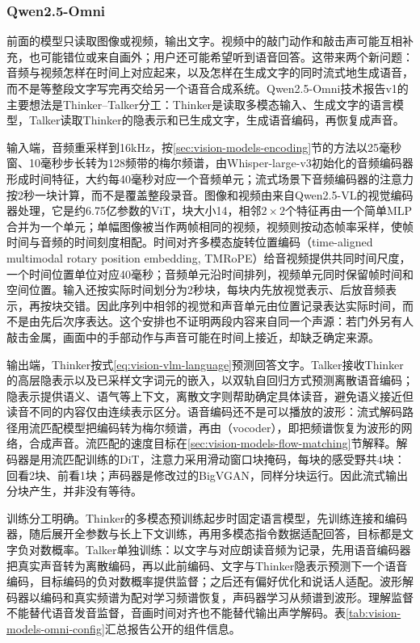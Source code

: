 \subsubsection{Qwen2.5-Omni}
\label{sec:vision-models-qwen-omni}

前面的模型只读取图像或视频，输出文字。视频中的敲门动作和敲击声可能互相补充，也可能错位或来自画外；用户还可能希望听到语音回答。这带来两个新问题：音频与视频怎样在时间上对应起来，以及怎样在生成文字的同时流式地生成语音，而不是等整段文字写完再交给另一个语音合成系统。Qwen2.5-Omni技术报告v1的主要想法是Thinker--Talker分工：Thinker是读取多模态输入、生成文字的语言模型，Talker读取Thinker的隐表示和已生成文字，生成语音编码，再恢复成声音。

输入端，音频重采样到16kHz，按\ref{sec:vision-models-encoding}节的方法以25毫秒窗、10毫秒步长转为128频带的梅尔频谱，由Whisper-large-v3初始化的音频编码器形成时间特征，大约每40毫秒对应一个音频单元；流式场景下音频编码器的注意力按2秒一块计算，而不是覆盖整段录音。图像和视频由来自Qwen2.5-VL的视觉编码器处理，它是约6.75亿参数的ViT，块大小14，相邻$2\times2$个特征再由一个简单MLP合并为一个单元；单幅图像被当作两帧相同的视频，视频则按动态帧率采样，使帧时间与音频的时间刻度相配。时间对齐多模态旋转位置编码（time-aligned multimodal rotary position embedding, TMRoPE）给音视频提供共同时间尺度，一个时间位置单位对应40毫秒；音频单元沿时间排列，视频单元同时保留帧时间和空间位置。输入还按实际时间划分为2秒块，每块内先放视觉表示、后放音频表示，再按块交错。因此序列中相邻的视觉和声音单元由位置记录表达实际时间，而不是由先后次序表达。这个安排也不证明两段内容来自同一个声源：若门外另有人敲击金属，画面中的手部动作与声音可能在时间上接近，却缺乏确定来源。

输出端，Thinker按式\eqref{eq:vision-vlm-language}预测回答文字。Talker接收Thinker的高层隐表示以及已采样文字词元的嵌入，以双轨自回归方式预测离散语音编码；隐表示提供语义、语气等上下文，离散文字则帮助确定具体读音，避免语义接近但读音不同的内容仅由连续表示区分。语音编码还不是可以播放的波形：流式解码路径用流匹配模型把编码转为梅尔频谱，再由（vocoder），即把频谱恢复为波形的网络，合成声音。流匹配的速度目标在\ref{sec:vision-models-flow-matching}节解释。解码器是用流匹配训练的DiT，注意力采用滑动窗口块掩码，每块的感受野共4块：回看2块、前看1块；声码器是修改过的BigVGAN，同样分块运行。因此流式输出分块产生，并非没有等待。

训练分工明确。Thinker的多模态预训练起步时固定语言模型，先训练连接和编码器，随后展开全参数与长上下文训练，再用多模态指令数据适配回答，目标都是文字负对数概率。Talker单独训练：以文字与对应朗读音频为记录，先用语音编码器把真实声音转为离散编码，再以此前编码、文字与Thinker隐表示预测下一个语音编码，目标编码的负对数概率提供监督；之后还有偏好优化和说话人适配。波形解码器以编码和真实频谱为配对学习频谱恢复，声码器学习从频谱到波形。理解监督不能替代语音发音监督，音画时间对齐也不能替代输出声学解码。表\ref{tab:vision-models-omni-config}汇总报告公开的组件信息。

